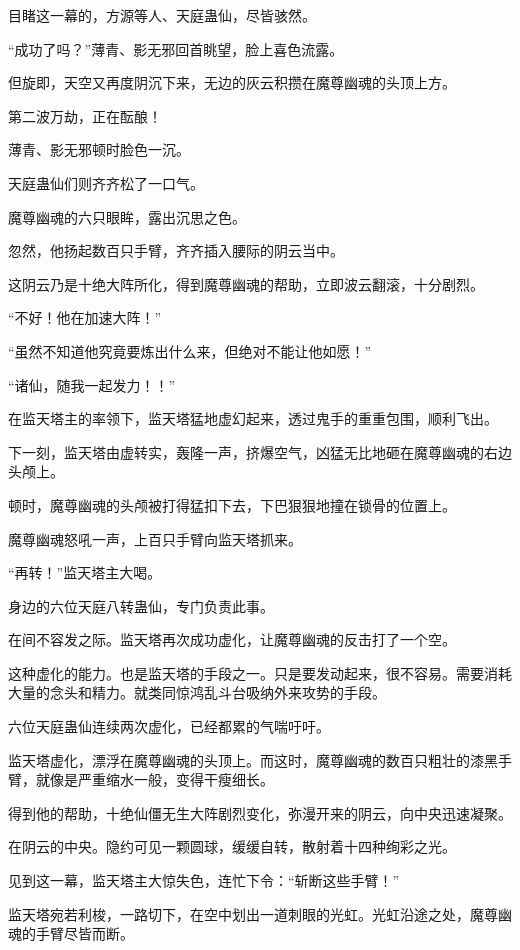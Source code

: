 \begin{this_body}
目睹这一幕的，方源等人、天庭蛊仙，尽皆骇然。

“成功了吗？”薄青、影无邪回首眺望，脸上喜色流露。

但旋即，天空又再度阴沉下来，无边的灰云积攒在魔尊幽魂的头顶上方。

第二波万劫，正在酝酿！

薄青、影无邪顿时脸色一沉。

天庭蛊仙们则齐齐松了一口气。

魔尊幽魂的六只眼眸，露出沉思之色。

忽然，他扬起数百只手臂，齐齐插入腰际的阴云当中。

这阴云乃是十绝大阵所化，得到魔尊幽魂的帮助，立即波云翻滚，十分剧烈。

“不好！他在加速大阵！”

“虽然不知道他究竟要炼出什么来，但绝对不能让他如愿！”

“诸仙，随我一起发力！！”

在监天塔主的率领下，监天塔猛地虚幻起来，透过鬼手的重重包围，顺利飞出。

下一刻，监天塔由虚转实，轰隆一声，挤爆空气，凶猛无比地砸在魔尊幽魂的右边头颅上。

顿时，魔尊幽魂的头颅被打得猛扣下去，下巴狠狠地撞在锁骨的位置上。

魔尊幽魂怒吼一声，上百只手臂向监天塔抓来。

“再转！”监天塔主大喝。

身边的六位天庭八转蛊仙，专门负责此事。

在间不容发之际。监天塔再次成功虚化，让魔尊幽魂的反击打了一个空。

这种虚化的能力。也是监天塔的手段之一。只是要发动起来，很不容易。需要消耗大量的念头和精力。就类同惊鸿乱斗台吸纳外来攻势的手段。

六位天庭蛊仙连续两次虚化，已经都累的气喘吁吁。

监天塔虚化，漂浮在魔尊幽魂的头顶上。而这时，魔尊幽魂的数百只粗壮的漆黑手臂，就像是严重缩水一般，变得干瘦细长。

得到他的帮助，十绝仙僵无生大阵剧烈变化，弥漫开来的阴云，向中央迅速凝聚。

在阴云的中央。隐约可见一颗圆球，缓缓自转，散射着十四种绚彩之光。

见到这一幕，监天塔主大惊失色，连忙下令：“斩断这些手臂！”

监天塔宛若利梭，一路切下，在空中划出一道刺眼的光虹。光虹沿途之处，魔尊幽魂的手臂尽皆而断。


\end{this_body}
